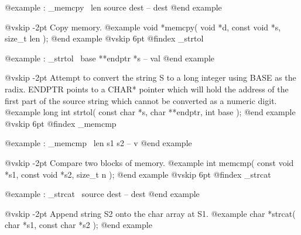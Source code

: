 @example
: _memcpy       \ len source dest -- dest @end example

@vskip -2pt
Copy memory.
@example
void *memcpy( void *d, const void *s, size_t len ); @end example
@vskip 6pt
@findex _strtol

@example
: _strtol       \ base **endptr *s -- val @end example

@vskip -2pt
Attempt to convert the string S to a long integer using
BASE as the radix. ENDPTR points to a CHAR* pointer which
will hold the address of the first part of the source string
which cannot be converted as a numeric digit.
@example
  long int strtol( const char *s, char **endptr, int base ); @end example
@vskip 6pt
@findex _memcmp

@example
: _memcmp       \ len s1 s2 -- v @end example

@vskip -2pt
Compare two blocks of memory.
@example
int memcmp( const void *s1, const void *s2, size_t n ); @end example
@vskip 6pt
@findex _strcat

@example
: _strcat       \ source dest -- dest @end example

@vskip -2pt
Append string S2 onto the char array at S1.
@example
  char *strcat( char *s1, const char *s2 ); @end example
